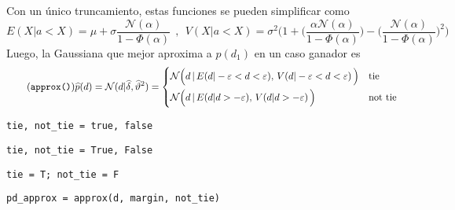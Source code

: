 \documentclass[article]{jss}
\newcommand{\N}{\mathcal{N}}
\begin{document}
%
Con un \'unico truncamiento, estas funciones se pueden simplificar como
%
\begin{equation*}
 E(X| a < X )   =  \mu + \sigma \frac{\N(\alpha)}{1 - \Phi(\alpha) } \ \ , \ \ V(X| a < X )  = \sigma^2 \Bigg( 1 + \bigg(\frac{\alpha \N(\alpha)}{1 - \Phi(\alpha) }\bigg) - \bigg(\frac{\N(\alpha)}{1 - \Phi(\alpha) }\bigg)^2 \Bigg) 
\end{equation*}
%
Luego, la Gaussiana que mejor aproxima a $p(d_1)$ en un caso ganador es
%
\begin{equation}\label{eq:p*_d} \tag{\texttt{approx()}}
 \widehat{p}(d) = \N(d | \widehat{\delta}, \widehat{\vartheta}^2) =
 \begin{cases*}
 \N\Big(d \,  | \, E(d | -\varepsilon < d < \varepsilon ) , \,  V(d | -\varepsilon < d < \varepsilon ) \, \Big) & \text{tie} \\
\N\Big(d \,  | \, E(d | d > -\varepsilon ) , \,  V(d | d > -\varepsilon ) \, \Big) & \text{not tie}
  \end{cases*}
\end{equation}
%
\begin{paracol}{3}
\begin{lstlisting}[backgroundcolor=\color{julia},belowskip=-0.77 \baselineskip]
tie, not_tie = true, false
\end{lstlisting}
\switchcolumn
\begin{lstlisting}[backgroundcolor=\color{python},belowskip=-0.77 \baselineskip]
tie, not_tie = True, False
\end{lstlisting}
\switchcolumn
\begin{lstlisting}[backgroundcolor=\color{r},belowskip=-0.77 \baselineskip]
tie = T; not_tie = F 
\end{lstlisting}
\end{paracol}
\begin{lstlisting}[backgroundcolor=\color{all}]
pd_approx = approx(d, margin, not_tie)
\end{lstlisting}
\end{document}
